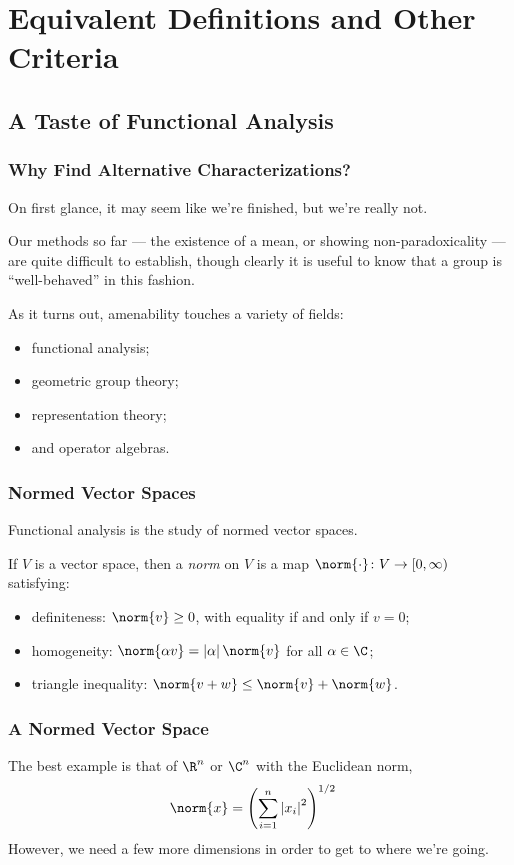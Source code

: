 \documentclass{beamer-custom}
\begin{document}
\section{Equivalent Definitions and Other Criteria}%
\subsection{A Taste of Functional Analysis}%
\begin{frame}
  \frametitle{Why Find Alternative Characterizations?}
  On first glance, it may seem like we're finished, but we're really not.\pause\newline

  Our methods so far --- the existence of a mean, or showing non-paradoxicality --- are quite difficult to establish, though clearly it is useful to know that a group is ``well-behaved'' in this fashion.\pause\newline

  As it turns out, amenability touches a variety of fields:
  \begin{itemize}
    \item functional analysis;\pause
    \item geometric group theory;\pause
    \item representation theory;\pause
    \item and operator algebras.
  \end{itemize}
\end{frame}
\begin{frame}
  \frametitle{Normed Vector Spaces}
  Functional analysis is the study of normed vector spaces.\pause\newline

  If $V$ is a vector space, then a \textit{norm} on $V$ is a map $\norm{\cdot}\colon V\rightarrow [0,\infty)$ satisfying:\pause
  \begin{itemize}
    \item definiteness: $\norm{v} \geq 0$, with equality if and only if $v = 0$;\pause
    \item homogeneity: $\norm{\alpha v} = \left\vert \alpha \right\vert\norm{v}$ for all $\alpha\in \C$;\pause
    \item triangle inequality: $\norm{v + w}\leq \norm{v} + \norm{w}$.
  \end{itemize}
\end{frame}
\begin{frame}
  \frametitle{A Normed Vector Space}
  The best example is that of $\R^n$ or $\C^n$ with the Euclidean norm,
  \begin{align*}
    \norm{x} &= \left( \sum_{i=1}^{n}\left\vert x_i \right\vert^2 \right)^{1/2}
  \end{align*}\pause
  However, we need a few more dimensions in order to get to where we're going.
\end{frame}
\end{document}
